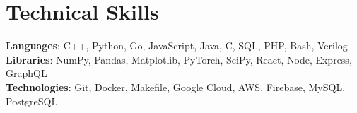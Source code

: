 \section{Technical Skills}
 \begin{itemize}[leftmargin=0.15in, label={}]
    \small{\item{
     \textbf{Languages}{: C++, Python, Go, JavaScript, Java, C, SQL, PHP, Bash, Verilog} \\
     \textbf{Libraries}{: NumPy, Pandas, Matplotlib, PyTorch, SciPy, React, Node, Express, GraphQL} \\
     \textbf{Technologies}{: Git, Docker, Makefile, Google Cloud, AWS, Firebase, MySQL, PostgreSQL}
    }}
 \end{itemize}